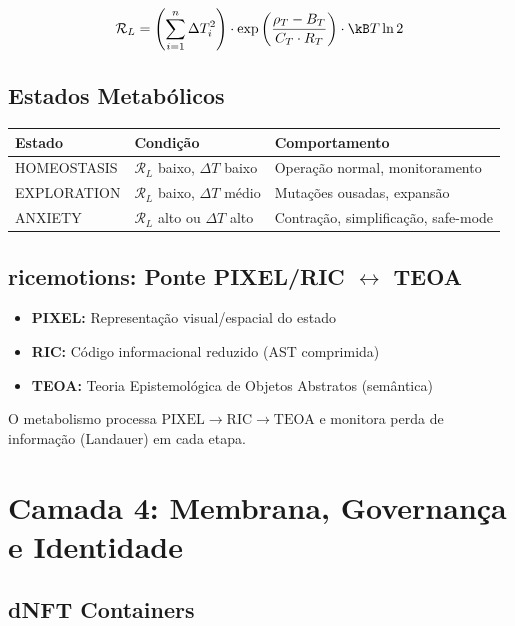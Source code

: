 \documentclass[11pt,a4paper]{article}
\newcommand{\rhoT}{\rho_T}
\newcommand{\BT}{B_T}
\newcommand{\CT}{C_T}
\newcommand{\RT}{R_T}
\newcommand{\DeltaT}{\Delta T}
\newcommand{\RL}{\mathcal{R}_L}
\begin{document}
\begin{equation}
    \RL = \left( \sum_{i=1}^{n} \DeltaT_i^2 \right) \cdot
    \exp\left( \frac{\rhoT - \BT}{\CT \cdot \RT} \right) \cdot
    \kB T \ln 2
\end{equation}

\subsection{Estados Metabólicos}

\begin{center}
\begin{tabular}{@{}lll@{}}
\toprule
\textbf{Estado} & \textbf{Condição} & \textbf{Comportamento} \\
\midrule
HOMEOSTASIS & $\RL$ baixo, $\DeltaT$ baixo & Operação normal, monitoramento \\
EXPLORATION & $\RL$ baixo, $\DeltaT$ médio & Mutações ousadas, expansão \\
ANXIETY & $\RL$ alto ou $\DeltaT$ alto & Contração, simplificação, safe-mode \\
\bottomrule
\end{tabular}
\end{center}

\subsection{ricemotions: Ponte PIXEL/RIC $\leftrightarrow$ TEOA}

\begin{itemize}
    \item \textbf{PIXEL:} Representação visual/espacial do estado
    \item \textbf{RIC:} Código informacional reduzido (AST comprimida)
    \item \textbf{TEOA:} Teoria Epistemológica de Objetos Abstratos (semântica)
\end{itemize}

O metabolismo processa $\text{PIXEL} \to \text{RIC} \to \text{TEOA}$ e monitora perda de informação (Landauer) em cada etapa.

\section{Camada 4: Membrana, Governança e Identidade}

\subsection{dNFT Containers}
\end{document}
